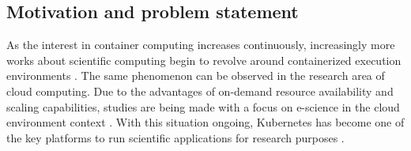 \subsection{Motivation and problem statement}
\label{s:Introduction:Motivation}




As the interest in container computing increases continuously, increasingly more works about scientific computing begin to revolve around containerized execution environments \cite{b:Skyport, b:Hyperflow-K8s}. %
The same phenomenon can be observed in the research area of cloud computing.
Due to the advantages of on-demand resource availability and scaling capabilities, studies are being made with a focus on e-science in the cloud environment context \cite{b:Magellan}. With this situation ongoing, Kubernetes has become one of the key platforms to run scientific applications for research purposes \cite{b:Enable-HPC-Cloud-K8s}.

